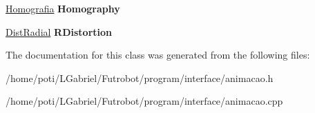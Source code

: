 \begin{DoxyCompactItemize}
\item 
\hyperlink{classHomografia}{Homografia} {\bfseries Homography}\hypertarget{classAnimacao_aeb16e0bf3bfa375b93264e2b1ac6f70f}{}\label{classAnimacao_aeb16e0bf3bfa375b93264e2b1ac6f70f}

\item 
\hyperlink{classDistRadial}{Dist\+Radial} {\bfseries R\+Distortion}\hypertarget{classAnimacao_a936b3f1058a1bbedc590c42d0a40bd03}{}\label{classAnimacao_a936b3f1058a1bbedc590c42d0a40bd03}

\end{DoxyCompactItemize}


The documentation for this class was generated from the following files\+:\begin{DoxyCompactItemize}
\item 
/home/poti/\+L\+Gabriel/\+Futrobot/program/interface/animacao.\+h\item 
/home/poti/\+L\+Gabriel/\+Futrobot/program/interface/animacao.\+cpp\end{DoxyCompactItemize}
